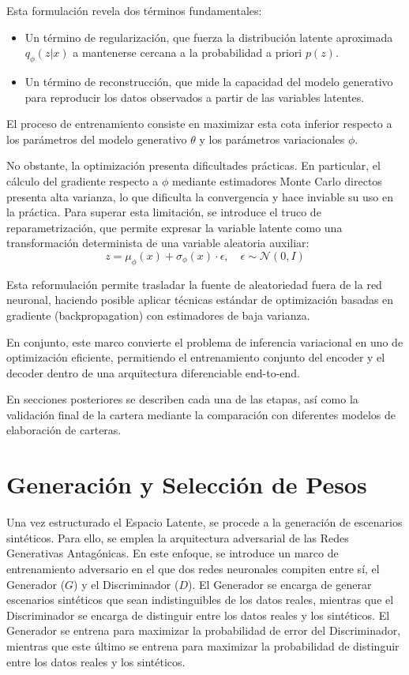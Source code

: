 Esta formulación revela dos términos fundamentales:

\begin{itemize}
     \item Un término de regularización, que fuerza la distribución latente aproximada $q_{\phi}(z|x)$ a mantenerse cercana a la probabilidad a priori $p(z)$.
     \item Un término de reconstrucción, que mide la capacidad del modelo generativo para reproducir los datos observados a partir de las variables latentes.
\end{itemize}
El proceso de entrenamiento consiste en maximizar esta cota inferior respecto a los parámetros del modelo generativo $\theta$ y los parámetros variacionales $\phi$.

No obstante, la optimización presenta dificultades prácticas. En particular, el cálculo del gradiente respecto a $\phi$ mediante estimadores Monte Carlo directos presenta alta varianza, lo que dificulta la convergencia y hace inviable su uso en la práctica. Para superar esta limitación, se introduce el truco de reparametrización, que permite expresar la variable latente como una transformación determinista de una variable aleatoria auxiliar:
\begin{equation}
    z = \mu_{\phi}(x) + \sigma_{\phi}(x) \cdot \epsilon,
\quad \epsilon \sim \mathcal{N}(0, I)
\end{equation}

Esta reformulación permite trasladar la fuente de aleatoriedad fuera de la red neuronal, haciendo posible aplicar técnicas estándar de optimización basadas en gradiente (backpropagation) con estimadores de baja varianza.

En conjunto, este marco convierte el problema de inferencia variacional en uno de optimización eficiente, permitiendo el entrenamiento conjunto del encoder y el decoder dentro de una arquitectura diferenciable end-to-end.

En secciones posteriores se describen cada una de las etapas, así como la validación final de la cartera mediante la comparación con diferentes modelos de elaboración de carteras.

\section{Generación y Selección de Pesos}

Una vez estructurado el Espacio Latente, se procede a la generación de escenarios sintéticos. Para ello, se emplea la arquitectura adversarial de las Redes Generativas Antagónicas. En este enfoque, se introduce un marco de entrenamiento adversario en el que dos redes neuronales compiten entre sí, el Generador ($G$) y el Discriminador ($D$). El Generador se encarga de generar escenarios sintéticos que sean indistinguibles de los datos reales, mientras que el Discriminador se encarga de distinguir entre los datos reales y los sintéticos. El Generador se entrena para maximizar la probabilidad de error del Discriminador, mientras que este último se entrena para maximizar la probabilidad de distinguir entre los datos reales y los sintéticos. 

